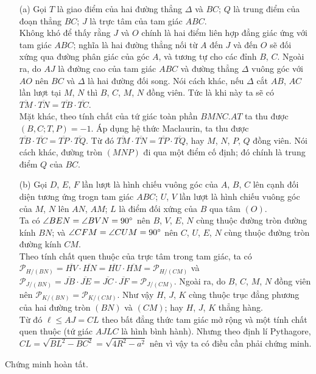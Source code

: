     \begin{solution}
        \hfill
        \begin{enumerate}
            \item[(a)] Gọi \(T\) là giao điểm của hai đường thẳng \(\Delta\) và \(BC\); \(Q\) là trung điểm của đoạn thẳng \(BC\); \(J\) là trực tâm của tam giác \(ABC\).\\
            Không khó để thấy rằng \(J\) và \(O\) chính là hai điểm liên hợp đẳng giác ứng với tam giác \(ABC\); nghĩa là hai đường thẳng nối từ \(A\) đến \(J\) và đến \(O\) sẽ đối xứng qua đường phân giác của góc \(A\), và tương tự cho các đỉnh \(B\), \(C\). Ngoài ra, do \(AJ\) là đường cao của tam giác \(ABC\) và đường thẳng \(\Delta\) vuông góc với \(AO\) nên \(BC\) và \(\Delta\) là hai đường đối song. Nói cách khác, nếu \(\Delta\) cắt \(AB\), \(AC\) lần lượt tại \(M\), \(N\) thì \(B\), \(C\), \(M\), \(N\) đồng viên. Tức là khi này ta sẽ có \(\overline{TM} \cdot \overline{TN} = \overline{TB} \cdot \overline{TC}\).\\
            Mặt khác, theo tính chất của tứ giác toàn phần \(BMNC.AT\) ta thu được \((B,C;T,P) = -1\). Áp dụng hệ thức Maclaurin, ta thu được \(\overline{TB} \cdot \overline{TC} = \overline{TP} \cdot \overline{TQ}\). Từ đó \(\overline{TM} \cdot \overline{TN} = \overline{TP} \cdot \overline{TQ}\), hay \(M\), \(N\), \(P\), \(Q\) đồng viên. Nói cách khác, đường tròn \((MNP)\) đi qua một điểm cố định; đó chính là trung điểm \(Q\) của \(BC\).
            \item[(b)] Gọi \(D\), \(E\), \(F\) lần lượt là hình chiếu vuông góc của \(A\), \(B\), \(C\) lên cạnh đối diện tương ứng trogn tam giác \(ABC\); \(U\), \(V\) lần lượt là hình chiếu vuông góc của \(M\), \(N\) lên \(AN\), \(AM\); \(L\) là điểm đối xứng của \(B\) qua tâm \((O)\).\\
            Ta có \(\angle BEN = \angle BVN = 90 \degree\) nên \(B\), \(V\), \(E\), \(N\) cùng thuộc đường tròn đường kính \(BN\); và \(\angle CFM = \angle CUM = 90 \degree\) nên \(C\), \(U\), \(E\), \(N\) cùng thuộc đường tròn đường kính \(CM\).\\
            Theo tính chất quen thuộc của trực tâm trong tam giác, ta có \(\mathcal{P}_{H/(BN)} = \overline{HV} \cdot \overline{HN} = \overline{HU} \cdot \overline{HM} = \mathcal{P}_{H/(CM)}\) và \(\mathcal{P}_{J/(BN)} = \overline{JB} \cdot \overline{JE} = \overline{JC} \cdot \overline{JF} = \mathcal{P}_{J/(CM)}\). Ngoài ra, do \(B\), \(C\), \(M\), \(N\) đồng viên nên \(\mathcal{P}_{K/(BN)} = \mathcal{P}_{K/(CM)}\). Như vậy \(H\), \(J\), \(K\) cùng thuộc trục đẳng phương của hai đường tròn \((BN)\) và \((CM)\); hay \(H\), \(J\), \(K\) thẳng hàng.\\
            Từ đó \(\ell \leq AJ = CL\) theo bất đẳng thức tam giác mở rộng và một tính chất quen thuộc (tứ giác \(AJLC\) là hình bình hành). Nhưng theo định lí Pythagore, \(CL = \sqrt{BL^2 - BC^2} = \sqrt{4R^2 - a^2}\) nên vì vậy ta có điều cần phải chứng minh.
        \end{enumerate}
        Chứng minh hoàn tất.
    \end{solution}

